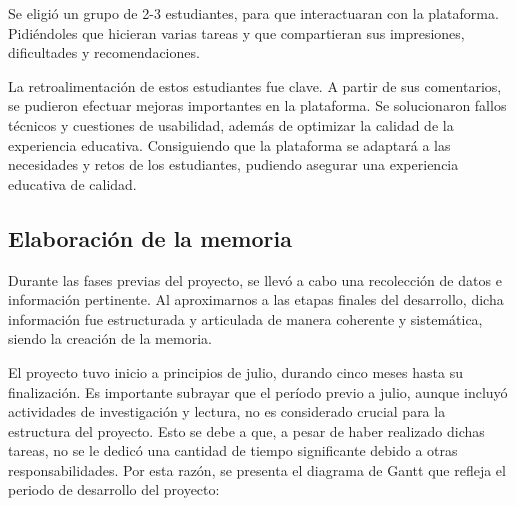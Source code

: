 Se eligió un grupo de 2-3 estudiantes, para que interactuaran con la plataforma. 
Pidiéndoles que hicieran varias tareas y que compartieran sus impresiones, dificultades y recomendaciones.

La retroalimentación de estos estudiantes fue clave. A partir de sus comentarios, se pudieron efectuar mejoras importantes en la plataforma. Se solucionaron fallos técnicos y cuestiones de usabilidad, además de optimizar la calidad de la experiencia educativa. Consiguiendo que la plataforma se adaptará a las necesidades y retos de los estudiantes, pudiendo asegurar una experiencia educativa de calidad.

\subsection{Elaboración de la memoria}

Durante las fases previas del proyecto, se llevó a cabo una recolección de datos e información pertinente. Al aproximarnos a las etapas finales del desarrollo, dicha información fue estructurada y articulada de manera coherente y sistemática, siendo la creación de la memoria.

El proyecto tuvo inicio a principios de julio, durando cinco meses hasta su finalización. Es importante subrayar que el período previo a julio, aunque incluyó actividades de investigación y lectura, no es considerado crucial para la estructura del proyecto. Esto se debe a que, a pesar de haber realizado dichas tareas, no se le dedicó una cantidad de tiempo significante debido a otras responsabilidades. Por esta razón, se presenta el diagrama de Gantt que refleja el periodo de desarrollo del proyecto:

